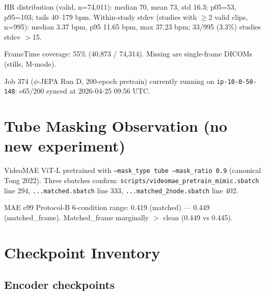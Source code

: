 \documentclass{article}
\begin{document}
HR distribution (valid, n=74{,}011): median 70, mean 73, std 16.3; p05=53, p95=103; tails 40--179 bpm.
Within-study stdev (studies with $\geq$2 valid clips, n=995): median 3.37 bpm, p95 11.65 bpm, max 37.23 bpm; 33/995 (3.3\%) studies stdev $>$15.

FrameTime coverage: 55\% (40{,}873 / 74{,}314). Missing are single-frame DICOMs (stills, M-mode).

Job 374 ($\phi$-JEPA Run D, 200-epoch pretrain) currently running on \texttt{ip-10-0-50-148}: e65/200 synced at 2026-04-25 09:56 UTC.

\section{Tube Masking Observation (no new experiment)}

VideoMAE ViT-L pretrained with \texttt{--mask\_type tube --mask\_ratio 0.9} (canonical Tong 2022).
Three sbatches confirm: \texttt{scripts/videomae\_pretrain\_mimic.sbatch} line 294, \texttt{...matched.sbatch} line 333, \texttt{...matched\_2node.sbatch} line 402.

MAE e99 Protocol-B 6-condition range: 0.419 (matched) --- 0.449 (matched\_frame). Matched\_frame marginally $>$ clean (0.449 vs 0.445).

\section{Checkpoint Inventory}

\subsection{Encoder checkpoints}
\end{document}
